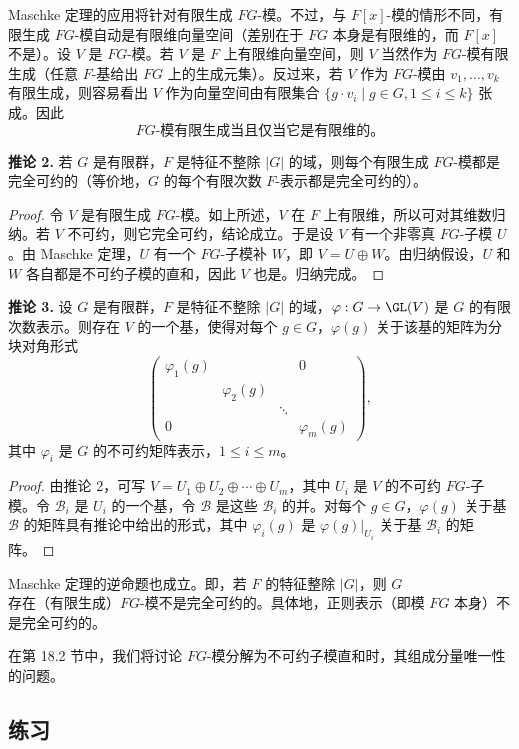 Maschke 定理的应用将针对有限生成 $FG$-模。不过，与 $F[x]$-模的情形不同，有限生成 $FG$-模自动是有限维向量空间（差别在于 $FG$ 本身是有限维的，而 $F[x]$ 不是）。设 $V$ 是 $FG$-模。若 $V$ 是 $F$ 上有限维向量空间，则 $V$ 当然作为 $FG$-模有限生成（任意 $F$-基给出 $FG$ 上的生成元集）。反过来，若 $V$ 作为 $FG$-模由 $v_1,
\ldots,v_k$ 有限生成，则容易看出 $V$ 作为向量空间由有限集合 $\{g\cdot v_i\mid g\in G,
1\leq i\leq k\}$ 张成。因此
\[
  FG\text{-模有限生成当且仅当它是有限维的。}
\]

\medskip
\noindent\textbf{推论 2.} 若 $G$ 是有限群，$F$ 是特征不整除 $|G|$ 的域，则每个有限生成 $FG$-模都是完全可约的（等价地，$G$ 的每个有限次数 $F$-表示都是完全可约的）。

\begin{proof}
令 $V$ 是有限生成 $FG$-模。如上所述，$V$ 在 $F$ 上有限维，所以可对其维数归纳。若 $V$ 不可约，则它完全可约，结论成立。于是设 $V$ 有一个非零真 $FG$-子模 $U$。由 Maschke 定理，$U$ 有一个 $FG$-子模补 $W$，即 $V=U\oplus W$。由归纳假设，$U$ 和 $W$ 各自都是不可约子模的直和，因此 $V$ 也是。归纳完成。
\end{proof}

\medskip
\noindent\textbf{推论 3.} 设 $G$ 是有限群，$F$ 是特征不整除 $|G|$ 的域，$\varphi:G\to\GL(V)$ 是 $G$ 的有限次数表示。则存在 $V$ 的一个基，使得对每个 $g\in G$，$\varphi(g)$ 关于该基的矩阵为分块对角形式
\[
  \begin{pmatrix}
  \varphi_1(g)&&&0\\
  &\varphi_2(g)&&\\
  &&\ddots&\\
  0&&&\varphi_m(g)
  \end{pmatrix},
\]
其中 $\varphi_i$ 是 $G$ 的不可约矩阵表示，$1\leq i\leq m$。

\begin{proof}
由推论 2，可写 $V=U_1\oplus U_2\oplus\cdots\oplus U_m$，其中 $U_i$ 是 $V$ 的不可约 $FG$-子模。令 $\mathcal B_i$ 是 $U_i$ 的一个基，令 $\mathcal B$ 是这些 $\mathcal B_i$ 的并。对每个 $g\in G$，$\varphi(g)$ 关于基 $\mathcal B$ 的矩阵具有推论中给出的形式，其中 $\varphi_i(g)$ 是 $\varphi(g)|_{U_i}$ 关于基 $\mathcal B_i$ 的矩阵。
\end{proof}

Maschke 定理的逆命题也成立。即，若 $F$ 的特征整除 $|G|$，则 $G$ 存在（有限生成）$FG$-模不是完全可约的。具体地，正则表示（即模 $FG$ 本身）不是完全可约的。

在第 18.2 节中，我们将讨论 $FG$-模分解为不可约子模直和时，其组成分量唯一性的问题。

\subsection*{练习}

